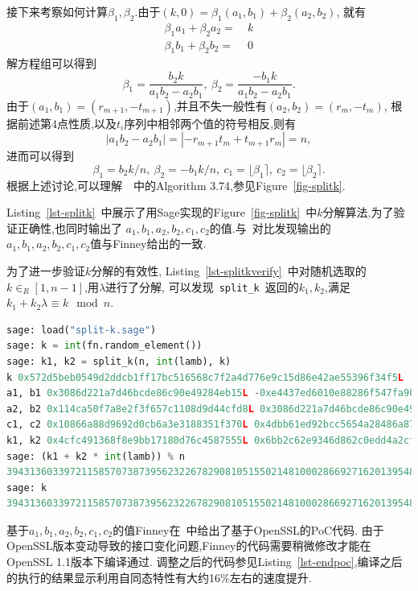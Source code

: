 \documentclass{article}
\newcommand{\code}[1]{\lstinline!#1!}
\begin{document}
接下来考察如何计算$\beta_1, \beta_2$.由于$(k, 0) = \beta_1(a_1,b_1) + \beta_2(a_2, b_2)$, 就有
\begin{equation}\nonumber
\begin{split}
\beta_1a_1 + \beta_2a_2 =& \  k\\
\beta_1b_1 + \beta_2b_2 =& \ 0
\end{split}
\end{equation}
解方程组可以得到
$$\beta_1 = \dfrac{b_2k}{a_1b_2 - a_2b_1}, \ \beta_2 = \dfrac{-b_1k}{a_1b_2-a_2b_1}.$$
由于$(a_1, b_1) = (r_{m+1}, - t_{m+1})$,并且不失一般性有$(a_2, b_2) = (r_{m}, - t_{m})$, 
根据前述第4点性质,以及$t_i$序列中相邻两个值的符号相反,则有
$$|a_1b_2-a_2b_1| = |-r_{m+1}t_{m}+ t_{m+1}r_{m}| = n,$$
进而可以得到
$$\beta_1 = b_2k / n, \ \beta_2 = -b_1k/n, \ c_1 = \lfloor \beta_1 \rceil, \  c_2 = \lfloor \beta_2 \rceil.$$
根据上述讨论,可以理解~\cite{guidetoecc}~中的Algorithm 3.74,参见Figure~\ref{fig-splitk}.

Listing~\ref{lst-splitk}~中展示了用Sage实现的Figure~\ref{fig-splitk}~中$k$分解算法,为了验证正确性,也同时输出了
$a_1, b_1, a_2, b_2, c_1, c_2$的值.与~\cite{halfinney}对比发现输出的$a_1, b_1, a_2, b_2, c_1, c_2$值与Finney给出的一致.



为了进一步验证$k$分解的有效性, Listing~\ref{lst-splitkverify}~中对随机选取的$k\in_R[1,n-1]$,用$\lambda$进行了分解,
可以发现~\code{split_k}~返回的$k_1, k_2$,满足$k_1 + k_2\lambda\equiv k\mod n$.
\begin{lstlisting}[language=python, caption=\texttt{verify multiplier split  with $\lambda$ for secp256k1}, label=lst-splitkverify]
sage: load("split-k.sage")
sage: k = int(fn.random_element())
sage: k1, k2 = split_k(n, int(lamb), k)
k 0x572d5beb0549d2ddcb1ff17bc516568c7f2a4d776e9c15d86e42ae55396f34f5L
a1, b1 0x3086d221a7d46bcde86c90e49284eb15L -0xe4437ed6010e88286f547fa90abfe4c3L
a2, b2 0x114ca50f7a8e2f3f657c1108d9d44cfd8L 0x3086d221a7d46bcde86c90e49284eb15L
c1, c2 0x10866a88d9692d0cb6a3e3188351f370L 0x4dbb61ed92bcc5654a28486a8793676aL
k1, k2 0x4cfc491368f8e9bb17180d76c4587555L 0x6bb2c62e9346d862c0edd4a2cf1e649eL
sage: (k1 + k2 * int(lamb)) % n
39431360339721158570738739562322678290810515502148100028669271620139548095733
sage: k
39431360339721158570738739562322678290810515502148100028669271620139548095733L
\end{lstlisting}

基于$a_1, b_1, a_2, b_2, c_1, c_2$的值Finney在~\cite{halfinney}中给出了基于OpenSSL的PoC代码.
由于OpenSSL版本变动导致的接口变化问题,Finney的代码需要稍微修改才能在OpenSSL 1.1版本下编译通过.
调整之后的代码参见Listing~\ref{lst-endpoc},编译之后的执行的结果显示利用自同态特性有大约16\%左右的速度提升.
\end{document}
